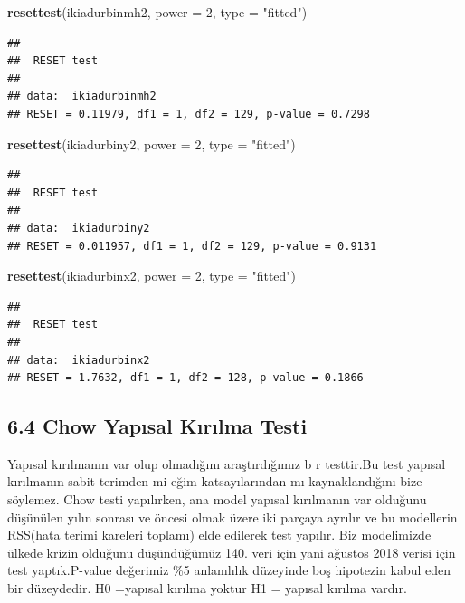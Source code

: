 \documentclass[]{article}
\newenvironment{Shaded}{\begin{snugshade}}{\end{snugshade}}
\newcommand{\KeywordTok}[1]{\textcolor[rgb]{0.13,0.29,0.53}{\textbf{#1}}}
\newcommand{\DataTypeTok}[1]{\textcolor[rgb]{0.13,0.29,0.53}{#1}}
\newcommand{\DecValTok}[1]{\textcolor[rgb]{0.00,0.00,0.81}{#1}}
\newcommand{\StringTok}[1]{\textcolor[rgb]{0.31,0.60,0.02}{#1}}
\newcommand{\NormalTok}[1]{#1}
\begin{document}
\begin{Shaded}
\begin{Highlighting}[]
\KeywordTok{resettest}\NormalTok{(ikiadurbinmh2, }\DataTypeTok{power =} \DecValTok{2}\NormalTok{, }\DataTypeTok{type =} \StringTok{"fitted"}\NormalTok{)}
\end{Highlighting}
\end{Shaded}

\begin{verbatim}
## 
##  RESET test
## 
## data:  ikiadurbinmh2
## RESET = 0.11979, df1 = 1, df2 = 129, p-value = 0.7298
\end{verbatim}

\begin{Shaded}
\begin{Highlighting}[]
\KeywordTok{resettest}\NormalTok{(ikiadurbiny2, }\DataTypeTok{power =} \DecValTok{2}\NormalTok{, }\DataTypeTok{type =} \StringTok{"fitted"}\NormalTok{)}
\end{Highlighting}
\end{Shaded}

\begin{verbatim}
## 
##  RESET test
## 
## data:  ikiadurbiny2
## RESET = 0.011957, df1 = 1, df2 = 129, p-value = 0.9131
\end{verbatim}

\begin{Shaded}
\begin{Highlighting}[]
\KeywordTok{resettest}\NormalTok{(ikiadurbinx2, }\DataTypeTok{power =} \DecValTok{2}\NormalTok{, }\DataTypeTok{type =} \StringTok{"fitted"}\NormalTok{)}
\end{Highlighting}
\end{Shaded}

\begin{verbatim}
## 
##  RESET test
## 
## data:  ikiadurbinx2
## RESET = 1.7632, df1 = 1, df2 = 128, p-value = 0.1866
\end{verbatim}

\subsection{6.4 Chow Yapısal Kırılma
Testi}\label{chow-yapsal-krlma-testi}

Yapısal kırılmanın var olup olmadığını araştırdığımız b r testtir.Bu
test yapısal kırılmanın sabit terimden mi eğim katsayılarından mı
kaynaklandığını bize söylemez. Chow testi yapılırken, ana model yapısal
kırılmanın var olduğunu düşünülen yılın sonrası ve öncesi olmak üzere
iki parçaya ayrılır ve bu modellerin RSS(hata terimi kareleri toplamı)
elde edilerek test yapılır. Biz modelimizde ülkede krizin olduğunu
düşündüğümüz 140. veri için yani ağustos 2018 verisi için test
yaptık.P-value değerimiz \%5 anlamlılık düzeyinde boş hipotezin kabul
eden bir düzeydedir. H0 =yapısal kırılma yoktur H1 = yapısal kırılma
vardır.
\end{document}
